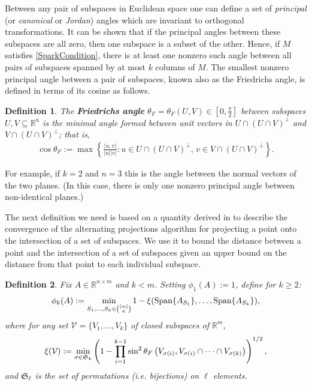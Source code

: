 \documentclass[journal, onecolumn]{IEEEtran}
\newtheorem{definition}{Definition}
\begin{document}
Between any pair of subspaces in Euclidean space one can define a set of \textit{principal} (or \textit{canonical} or \textit{Jordan}) angles which are invariant to orthogonal transformations. It can be shown that if the principal angles between these subspaces are all zero, then one subspace is a subset of the other. Hence, if $M$ satisfies \eqref{SparkCondition}, there is at least one nonzero such angle between all pairs of subspaces spanned by at most $k$ columns of $M$. The smallest nonzero principal angle between a pair of subspaces, known also as the Friedrichs angle, is defined in terms of its cosine as follows.
\begin{definition}\label{FriedrichsDefinition}
The \textbf{Friedrichs angle} $\theta_F = \theta_F(U,V) \in [0,\frac{\pi}{2}]$ between subspaces $U,V \subseteq \mathbb{R}^n$ is the minimal angle formed between unit vectors in $U \cap (U \cap V)^\perp$ and $V \cap (U \cap V)^\perp$; that is,
\begin{align}
\cos{\theta_F} := \max\left\{ \frac{ \langle u, v \rangle }{|u||v|}: u \in U \cap (U \cap V)^\perp, \, v \in V \cap (U \cap V)^\perp \right\}.
\end{align}
\end{definition}
For example, if $k=2$ and $n=3$ this is the angle between the normal vectors of the two planes. (In this case, there is only one nonzero principal angle between non-identical planes.) 

The next definition we need is based on a quantity derived in \cite{Deutsch} to describe the convergence of the alternating projections algorithm for projecting a point onto the intersection of a set of subspaces. We use it to bound the distance between a point and the intersection of a set of subspaces given an upper bound on the distance from that point to each individual subspace.

\begin{definition}\label{SpecialSupportSet}
Fix $A \in \mathbb{R}^{n \times m}$ and $k < m$. Setting $\phi_1(A) := 1$, define for $k \geq 2$:
\begin{align}\label{rho}
\phi_k(A) := \min_{ S_1,\ldots,S_k \in {[m] \choose k} } 1 - \xi( \text{\rm Span}\{A_{S_1}\}, \ldots,  \text{\rm Span}\{A_{S_k}\}),
\end{align}
where for any set $\mathcal{V} = \{V_1, \ldots, V_k\}$ of closed subspaces of $\mathbb{R}^m$, 
\begin{align}
\xi(\mathcal{V}) := \min_{\sigma \in \frak{S}_k} \left(1 - \prod_{i=1}^{k-1} \sin^2  \theta_F \left(V_{\sigma(i)}, V_{\sigma(i)} \cap \cdots \cap V_{\sigma(k)}\right)  \right)^{1/2},
\end{align}
%
and $\frak{S}_{\ell}$ is the set of permutations (i.e. bijections) on $\ell$ elements.
\end{definition}
\end{document}
